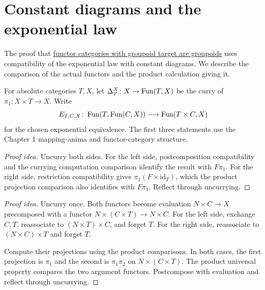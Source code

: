 \documentclass[11pt]{article}
\begin{document}
\section*{Constant diagrams and the exponential law}

The proof that \href{groupoids.html}{functor categories with groupoid target
are groupoids} uses compatibility of the exponential law with constant
diagrams. We describe the comparison of the actual functors and the
product calculation giving it.

For absolute categories $T,X$, let
$\Delta_T^X\colon X\to\operatorname{Fun}(T,X)$ be the curry of
$\pi_1\colon X\times T\to X$. Write
\[
 E_{T,C,X}\colon\operatorname{Fun}(T,\operatorname{Fun}(C,X))\longrightarrow\operatorname{Fun}(T\times C,X)
\]
for the chosen exponential equivalence. The first three statements use
the Chapter 1 mapping-anima and functor-category structure.

\begin{proof}[Proof idea]
Uncurry both sides. For the left side, postcomposition compatibility and
the currying computation comparison identify the result with $F\pi_1$.
For the right side, restriction compatibility gives
$\pi_1(F\times\mathrm{id}_T)$, which the product projection comparison
also identifies with $F\pi_1$. Reflect through uncurrying.
\end{proof}

\begin{proof}[Proof idea]
Uncurry once. Both functors become evaluation $N\times C\to X$
precomposed with a functor $N\times(C\times T)\to N\times C$.
For the left side, exchange $C,T$, reassociate to $(N\times T)\times C$,
and forget $T$. For the right side, reassociate to $(N\times C)\times T$
and forget $T$.

Compute their projections using the product comparisons. In both cases,
the first projection is $\pi_1$ and the second is $\pi_1\pi_2$ on
$N\times(C\times T)$. The product universal property compares the two
argument functors. Postcompose with evaluation and reflect through uncurrying.
\end{proof}
\end{document}
